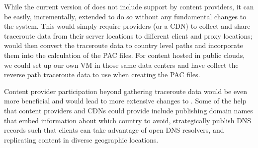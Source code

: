 While the current version of \system{} does not include support by content providers, it can be easily, incrementally,
extended to do so without any fundamental changes to the system.  This would simply require providers (or a 
CDN) to collect and share traceroute data from their server locations to different client and proxy locations; \system{} 
would then convert the traceroute data to country level paths and incorporate them into the calculation of the 
PAC files.  For content hosted in public clouds, we could set up our own VM in those same data centers and have 
\system{} collect the reverse path traceroute data to use when creating the PAC files.  

Content provider participation beyond gathering traceroute data would be even more beneficial and would lead to 
more extensive changes to \system{}.  Some of the help that content providers and CDNs could provide include 
publishing domain names that embed information about which country to avoid, strategically publish DNS records such 
that clients can take advantage of open DNS resolvers, and replicating content in diverse geographic locations.

%
